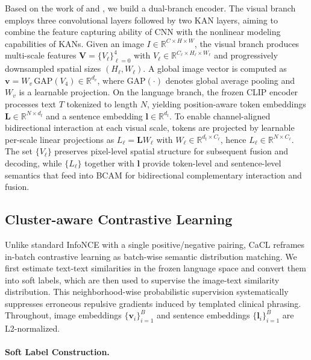 \documentclass{article} %
\begin{document}
Based on the work of \citet{li2025u} and \citet{radford2021learning}, we build a dual-branch encoder. The visual branch employs three convolutional layers followed by two KAN layers, aiming to combine the feature capturing ability of CNN with the nonlinear modeling capabilities of KANs. Given an image $I\in\mathbb{R}^{C\times H\times W}$, the visual branch produces multi-scale features $\mathbf V=\{V_\ell\}_{\ell=0}^{4}$ with $V_\ell\in\mathbb{R}^{C_\ell\times H_\ell\times W_\ell}$ and progressively downsampled spatial sizes $(H_\ell,W_\ell)$. A global image vector is computed as $\mathbf v=W_v\,\mathrm{GAP}(V_4)\in\mathbb{R}^{d_v}$, where $\mathrm{GAP}(\cdot)$ denotes global average pooling and $W_v$ is a learnable projection. On the language branch, the frozen CLIP encoder processes text $T$ tokenized to length $N$, yielding position-aware token embeddings $\mathbf L\in\mathbb{R}^{N\times d_t}$ and a sentence embedding $\mathbf l\in\mathbb{R}^{d_t}$. To enable channel-aligned bidirectional interaction at each visual scale, tokens are projected by learnable per-scale linear projections as $L_\ell=\mathbf L W_\ell$ with $W_\ell\in\mathbb{R}^{d_t\times C_\ell}$, hence $L_\ell\in\mathbb{R}^{N\times C_\ell}$. The set $\{V_\ell\}$ preserves pixel-level spatial structure for subsequent fusion and decoding, while $\{L_\ell\}$ together with $\mathbf l$ provide token-level and sentence-level semantics that feed into BCAM for bidirectional complementary interaction and fusion.

\subsection{Cluster-aware Contrastive Learning}

Unlike standard InfoNCE with a single positive/negative pairing, CaCL reframes in-batch contrastive learning as batch-wise semantic distribution matching. We first estimate text-text similarities in the frozen language space and convert them into soft labels, which are then used to supervise the image-text similarity distribution. This neighborhood-wise probabilistic supervision systematically suppresses erroneous repulsive gradients induced by templated clinical phrasing. Throughout, image embeddings $\{\mathbf v_i\}_{i=1}^{B}$ and sentence embeddings $\{\mathbf l_i\}_{i=1}^{B}$ are L2-normalized.

\paragraph{Soft Label Construction.}
\end{document}
